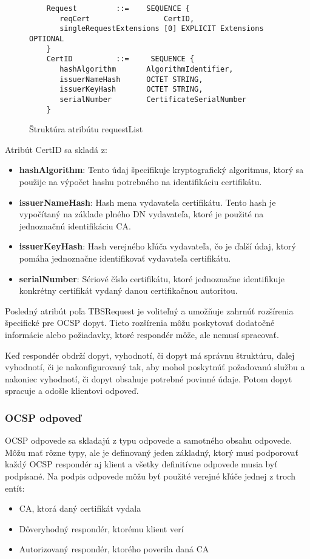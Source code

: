 \documentclass[12pt, twoside]{book}
\begin{document}
\begin{figure}[H]
\begin{lstlisting}
    Request         ::=    SEQUENCE {
       reqCert                 CertID,
       singleRequestExtensions [0] EXPLICIT Extensions OPTIONAL
    }
    CertID          ::=     SEQUENCE {
       hashAlgorithm       AlgorithmIdentifier,
       issuerNameHash      OCTET STRING, 
       issuerKeyHash       OCTET STRING, 
       serialNumber        CertificateSerialNumber
    }
\end{lstlisting}
\caption{Štruktúra atribútu requestList}
\end{figure}

Atribút CertID sa skladá z:

\begin{itemize}
\item \textbf{hashAlgorithm}: Tento údaj špecifikuje kryptografický algoritmus, ktorý sa použije na výpočet hashu potrebného na identifikáciu certifikátu. 

\item \textbf{issuerNameHash}: Hash mena vydavateľa certifikátu. Tento hash je vypočítaný na základe plného DN vydavateľa, ktoré je použité na jednoznačnú identifikáciu CA.

\item \textbf{issuerKeyHash}: Hash verejného kľúča vydavateľa, čo je ďalší údaj, ktorý pomáha jednoznačne identifikovať vydavateľa certifikátu.

\item \textbf{serialNumber}: Sériové číslo certifikátu, ktoré jednoznačne identifikuje konkrétny certifikát vydaný danou certifikačnou autoritou.
\end{itemize}

Posledný atribút poľa TBSRequest je voliteľný a umožňuje zahrnúť rozšírenia špecifické pre OCSP dopyt. Tieto rozšírenia môžu poskytovať dodatočné informácie alebo požiadavky, ktoré respondér môže, ale nemusí spracovať.\cite{rfc6960}

Keď respondér obdrží dopyt, vyhodnotí, či dopyt má správnu štruktúru, ďalej vyhodnotí, či je nakonfigurovaný tak, aby mohol poskytnúť požadovanú službu a nakoniec vyhodnotí, či dopyt obsahuje potrebné povinné údaje. Potom dopyt spracuje a odošle klientovi odpoveď.\cite{rfc6960}

\subsubsection{OCSP odpoveď}
OCSP odpovede sa skladajú z typu odpovede a samotného obsahu odpovede.\cite{rfc6960} Môžu mať rôzne typy, ale je definovaný jeden základný, ktorý musí podporovať každý OCSP respondér aj klient a všetky definitívne odpovede musia byť podpísané. Na podpis odpovede môžu byť použité verejné kľúče jednej z troch entít:
\begin{itemize}
\item CA, ktorá daný certifikát vydala
\item Dôveryhodný respondér, ktorému klient verí
\item Autorizovaný respondér, ktorého poverila daná CA
\end{itemize}
\end{document}
